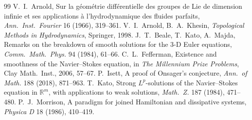 \documentclass[11pt,a4paper]{article}
\theoremstyle{plain}
\theoremstyle{definition}
\theoremstyle{remark}
\begin{document}
\begin{thebibliography}{99}
 V.~I.~Arnold, Sur la g\'eom\'etrie diff\'erentielle des groupes de Lie de dimension infinie et ses applications \`a l'hydrodynamique des fluides parfaits, \emph{Ann.\ Inst.\ Fourier} 16 (1966), 319--361.
 V.~I.~Arnold, B.~A.~Khesin, \emph{Topological Methods in Hydrodynamics}, Springer, 1998.
 J.~T.~Beale, T.~Kato, A.~Majda, Remarks on the breakdown of smooth solutions for the 3-D Euler equations, \emph{Comm.\ Math.\ Phys.} 94 (1984), 61--66.
 C.~L.~Fefferman, Existence and smoothness of the Navier--Stokes equation, in \emph{The Millennium Prize Problems}, Clay Math.\ Inst., 2006, 57--67.
 P.~Isett, A proof of Onsager's conjecture, \emph{Ann.\ of Math.} 188 (2018), 871--963.
 T.~Kato, Strong $L^p$-solutions of the Navier--Stokes equation in $\mathbb R^m$, with applications to weak solutions, \emph{Math.\ Z.} 187 (1984), 471--480.
 P.~J.~Morrison, A paradigm for joined Hamiltonian and dissipative systems, \emph{Physica D} 18 (1986), 410--419.
\end{thebibliography}
\end{document}
